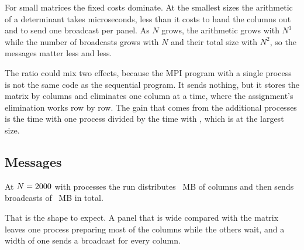 For small matrices the fixed costs dominate. At the smallest sizes the arithmetic of a
determinant takes microseconds, less than it costs to hand the columns out and to send one
broadcast per panel. As $N$ grows, the arithmetic grows with $N^3$ while the number of
broadcasts grows with $N$ and their total size with $N^2$, so the messages matter less and
less.

The ratio could mix two effects, because the MPI program with a single process is not
the same code as the sequential program. It sends nothing, but it stores the matrix by
columns and eliminates one column at a time, where the assignment's elimination works row
by row. \MpiOneProcessSentence{} \MpiOneProcessWidthSentence{} The gain that comes from
the additional processes is the time with one process divided by the time with
\MpiMostProcesses, which is \MpiParallelGain{} at the largest size.

\subsection{Messages}

At $N = 2000$ with \MpiMostProcesses{} processes the run distributes
\MpiLargestDistributedMegabytes~MB of columns and then sends \MpiLargestPanels{} broadcasts
of \MpiLargestBroadcastMegabytes~MB in total.

\MpiBlockSentence{} That is the shape to expect. A panel that is wide compared with the
matrix leaves one process preparing most of the columns while the others wait, and a width
of one sends a broadcast for every column.

\begin{table}[t]
  \caption{Sequential time divided by MPI time for different panel widths $b$, with
  \MpiBlockProcesses{} processes. Higher is better. Bold marks the best width for each size.}
  \label{tab:blocks}
  \centering
  \footnotesize
  
\end{table}

